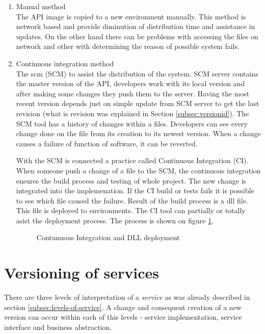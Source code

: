 \begin{enumerate}
  \item{Manual method} \hfill \\
  The API image is copied to a new environment manually. This method is network based and provide diminution of distribution time and assistance in updates. On the other hand there can be problems with accessing the files on network and other with determining the reason of possible system fails. 
  \item{Continuous integration method} \hfill \\
  The \gls{scm} (SCM) to assist the distribution of the system. SCM server contains the master version of the API, developers work with its local version and after making some changes they push them to the server. Having the most recent version depends just on simple update from SCM server to get the last revision (what is revision was explained in Section \ref{subsec:versionid}). The SCM tool has a history of changes within a files. Developers can see every change done on the file from its creation to its newest version. When a change causes a failure of function of software, it can be reverted.
  
  With the SCM is connected a practice called Continuous Integration (CI). When someone push a change of a file to the SCM, the continuous integration ensures the build process and testing of whole project. The new change is integrated into the implemenation. If the CI build or tests fails it is possible to see which file caused the failure. 
  Result of the build process is a \gls{dll} file. This file is deployed to environments. The CI tool can partially or totally asist the deployment process. The process is shown on figure \ref{fig:deployment-process}.
  
\begin{figure}[htp] 
\caption{Contunuous Integration and DLL deployment}
\label{fig:deployment-process}
\end{figure} 
   
\end{enumerate}


\section{Versioning of services}
\label{sec:verioningservices}
There are three levels of interpretation of a \emph{service} as was already described in section \ref{subsec:levels-of-service}. A change and consequent creation of a new version can occur within each of this levels - service implementation, service interface and business abstraction.


